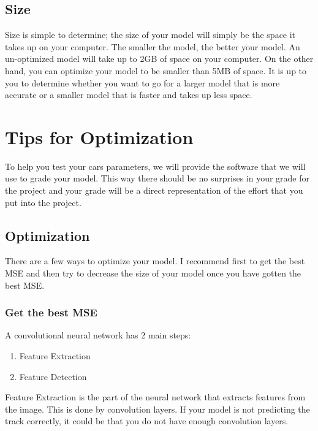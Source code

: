 \documentclass[11pt]{report}
\begin{document}
\section{Size}
Size is simple to determine; the size of your model will simply be the space it takes up on your computer. The smaller the model, the better your model. An un-optimized model will take up to 2GB of space on your computer. On the other hand, you can optimize your model to be smaller than 5MB of space. It is up to you to determine whether you want to go for a larger model that is more accurate or a smaller model that is faster and takes up less space.

\chapter{Tips for Optimization}
To help you test your cars parameters, we will provide the software that we will use to grade your model. This way there should be no surprises in your grade for the project and your grade will be a direct representation of the effort that you put into the project.


\section{Optimization}
There are a few ways to optimize your model. I recommend first to get the best MSE and then try to decrease the size of your model once you have gotten the best MSE. 

\subsection{Get the best MSE}
A convolutional neural network has 2 main steps:
\begin{enumerate}
    \item Feature Extraction
    \item Feature Detection
\end{enumerate}

Feature Extraction is the part of the neural network that extracts features from the image. This is done by convolution layers. If your model is not predicting the track correctly, it could be that you do not have enough convolution layers.
\end{document}
